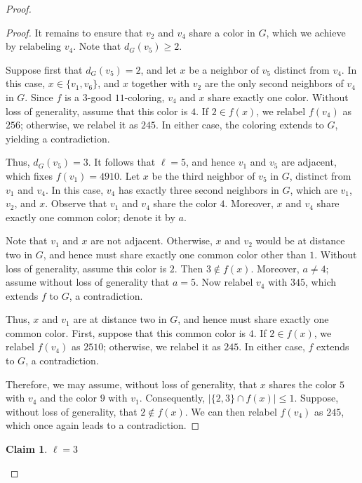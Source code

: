 \documentclass[12pt]{article}
\numberwithin{theorem}{section}
\numberwithin{conjecture}{section}
\numberwithin{corollary}{section}
\numberwithin{example}{section}
\numberwithin{lemma}{section}
\numberwithin{proposition}{section}
\numberwithin{problem}{section}
\numberwithin{remark}{section}
\newtheorem{claim}{Claim}
\numberwithin{claim}{theorem}
\numberwithin{definition}{section}
\begin{document}
\begin{proof}
\begin{proof}
\noindent It remains to ensure that $v_2$ and $v_4$ share a color in $G$, which we achieve by relabeling $v_4$. Note that $d_G(v_5) \ge 2$.

\noindent Suppose first that $d_G(v_5)=2$, and let $x$ be a neighbor of $v_5$ distinct from $v_4$. In this case, $x \in \{v_1, v_6\}$, and $x$ together with $v_2$ are the only second neighbors of $v_4$ in $G$. Since $f$ is a $3$-good $11$-coloring, $v_4$ and $x$ share exactly one color. Without loss of generality, assume that this color is $4$. If $2 \in f(x)$, we relabel $f(v_4)$ as $256$; otherwise, we relabel it as $245$. In either case, the coloring extends to $G$, yielding a contradiction.

\noindent Thus, $d_G(v_5)=3$. It follows that $\ell=5$, and hence $v_1$ and $v_5$ are adjacent, which fixes $f(v_1)=4910$. Let $x$ be the third neighbor of $v_5$ in $G$, distinct from $v_1$ and $v_4$. In this case, $v_4$ has exactly three second neighbors in $G$, which are $v_1$, $v_2$, and $x$. Observe that $v_1$ and $v_4$ share the color $4$. Moreover, $x$ and $v_4$ share exactly one common color; denote it by $a$.

\noindent Note that $v_1$ and $x$ are not adjacent. Otherwise, $x$ and $v_2$ would be at distance two in $G$, and hence must share exactly one common color other than $1$. Without loss of generality, assume this color is $2$. Then $3 \notin f(x)$. Moreover, $a \neq 4$; assume without loss of generality that $a=5$. Now relabel $v_4$ with $345$, which extends $f$ to $G$, a contradiction.

\noindent Thus, $x$ and $v_1$ are at distance two in $G$, and hence must share exactly one common color. First, suppose that this common color is $4$. If $2 \in f(x)$, we relabel $f(v_4)$ as $2510$; otherwise, we relabel it as $245$. In either case, $f$ extends to $G$, a contradiction.

\noindent Therefore, we may assume, without loss of generality, that $x$ shares the color $5$ with $v_4$ and the color $9$ with $v_1$. Consequently, $|\{2,3\} \cap f(x)| \leq 1$. Suppose, without loss of generality, that $2 \notin f(x)$. We can then relabel $f(v_4)$ as $245$, which once again leads to a contradiction.\end{proof}

\begin{claim}
    $\ell= 3$
\end{claim}


\end{proof}
\end{document}
